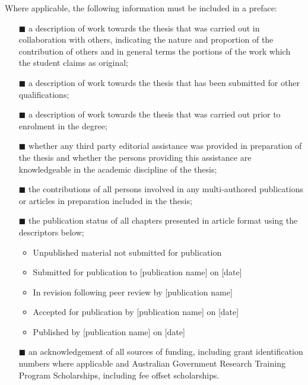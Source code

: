 {Where applicable, the following information must be included in a preface:
\begin{itemize}
\item[\tiny{$\blacksquare$}] a description of work towards the thesis that was carried out in collaboration with others, indicating the nature and proportion of the contribution of others and in general terms the portions of the work which the student claims as original;
\item[\tiny{$\blacksquare$}] a description of work towards the thesis that has been submitted for other qualifications;
\item[\tiny{$\blacksquare$}] a description of work towards the thesis that was carried out prior to enrolment in the degree;
\item[\tiny{$\blacksquare$}] whether any third party editorial assistance was provided in preparation of
the thesis and whether the persons providing this assistance are knowledgeable in the academic discipline of the thesis;
\item[\tiny{$\blacksquare$}] the contributions of all persons involved in any multi-authored publications or
articles in preparation included in the thesis;
\item[\tiny{$\blacksquare$}] the publication status of all chapters presented in article format using the
descriptors below;
    \begin{itemize}
        \item Unpublished material not submitted for publication
        \item Submitted for publication to [publication name] on [date]
        \item In revision following peer review by [publication name]
        \item Accepted for publication by [publication name] on [date]
        \item Published by [publication name] on [date]
    \end{itemize}
\item[\tiny{$\blacksquare$}] an acknowledgement of all sources of funding, including grant identification
numbers where applicable and Australian Government Research Training Program Scholarships, including fee offset scholarships.
\end{itemize}



}

